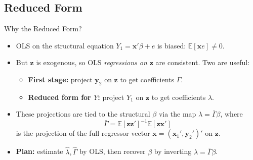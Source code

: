 \documentclass[aspectratio=169, handout]{beamer}
\numberwithin{equation}{section}
\begin{document}
\subsection{Reduced Form}

\begin{frame}{Why the Reduced Form?}
\begin{itemize}
\item OLS on the structural equation $Y_1 = \bm{x}'\beta + e$ is biased: $\mathbb{E}[\bm{x}e]\neq 0$.
\item But $\bm{z}$ is exogenous, so OLS \emph{regressions on $\bm{z}$} are consistent. Two are useful:
\begin{itemize}
\item \textbf{First stage:} project $\bm{y}_2$ on $\bm{z}$ to get coefficients $\Gamma$.
\item \textbf{Reduced form for $Y$:} project $Y_1$ on $\bm{z}$ to get coefficients $\lambda$.
\end{itemize}
\item These projections are tied to the structural $\beta$ via the map $\lambda = \bar{\Gamma}\beta$, where
$$\bar{\Gamma} = \mathbb{E}[\bm{z}\bm{z}']^{-1}\mathbb{E}[\bm{z}\bm{x}']$$
is the projection of the full regressor vector $\bm{x}=(\bm{x}_1', \bm{y}_2')'$ on $\bm{z}$.
\item \textbf{Plan:} estimate $\hat{\lambda}, \hat{\Gamma}$ by OLS, then recover $\beta$ by inverting $\lambda = \bar{\Gamma}\beta$.
\end{itemize}
\end{frame}
\end{document}
